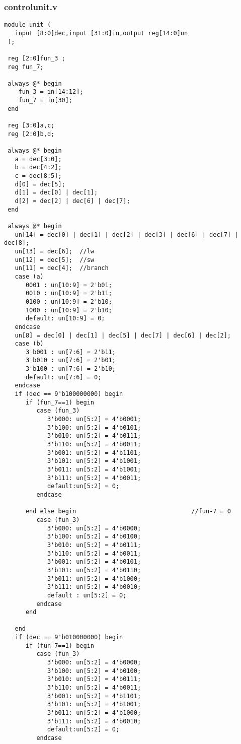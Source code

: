 \documentclass[12pt]{article}
\begin{document}
\subsubsection{controlunit.v}
\begin{lstlisting}
module unit (
   input [8:0]dec,input [31:0]in,output reg[14:0]un
 );

 reg [2:0]fun_3 ;
 reg fun_7;

 always @* begin
    fun_3 = in[14:12];
    fun_7 = in[30];
 end

 reg [3:0]a,c;
 reg [2:0]b,d;

 always @* begin
   a = dec[3:0];
   b = dec[4:2];
   c = dec[8:5];
   d[0] = dec[5];
   d[1] = dec[0] | dec[1];
   d[2] = dec[2] | dec[6] | dec[7];
 end
   
 always @* begin
   un[14] = dec[0] | dec[1] | dec[2] | dec[3] | dec[6] | dec[7] | dec[8];
   un[13] = dec[6];  //lw
   un[12] = dec[5];  //sw
   un[11] = dec[4];  //branch
   case (a)
      0001 : un[10:9] = 2'b01;
      0010 : un[10:9] = 2'b11;
      0100 : un[10:9] = 2'b10;
      1000 : un[10:9] = 2'b10;
      default: un[10:9] = 0;
   endcase
   un[8] = dec[0] | dec[1] | dec[5] | dec[7] | dec[6] | dec[2];
   case (b)
      3'b001 : un[7:6] = 2'b11;
      3'b010 : un[7:6] = 2'b01;
      3'b100 : un[7:6] = 2'b10; 
      default: un[7:6] = 0; 
   endcase
   if (dec == 9'b100000000) begin
      if (fun_7==1) begin
         case (fun_3)
            3'b000: un[5:2] = 4'b0001;
            3'b100: un[5:2] = 4'b0101;
            3'b010: un[5:2] = 4'b0111;
            3'b110: un[5:2] = 4'b0011;
            3'b001: un[5:2] = 4'b1101;
            3'b101: un[5:2] = 4'b1001; 
            3'b011: un[5:2] = 4'b1001;
            3'b111: un[5:2] = 4'b0011;
            default:un[5:2] = 0; 
         endcase

      end else begin                                //fun-7 = 0 
         case (fun_3)                          
            3'b000: un[5:2] = 4'b0000;
            3'b100: un[5:2] = 4'b0100;
            3'b010: un[5:2] = 4'b0111;
            3'b110: un[5:2] = 4'b0011;
            3'b001: un[5:2] = 4'b0101;
            3'b101: un[5:2] = 4'b0110; 
            3'b011: un[5:2] = 4'b1000;
            3'b111: un[5:2] = 4'b0010;
            default : un[5:2] = 0;
         endcase
      end
      
   end
   if (dec == 9'b010000000) begin
      if (fun_7==1) begin
         case (fun_3)
            3'b000: un[5:2] = 4'b0000;
            3'b100: un[5:2] = 4'b0100;
            3'b010: un[5:2] = 4'b0111;
            3'b110: un[5:2] = 4'b0011;
            3'b001: un[5:2] = 4'b1101;
            3'b101: un[5:2] = 4'b1001; 
            3'b011: un[5:2] = 4'b1000;
            3'b111: un[5:2] = 4'b0010;
            default:un[5:2] = 0; 
         endcase


\end{lstlisting}
\end{document}
